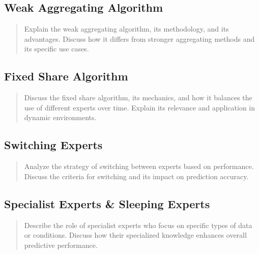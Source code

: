 \documentclass[11pt]{article} %
\theoremstyle{plain}
\theoremstyle{definition}
\begin{document}
\subsection{Weak Aggregating Algorithm}
\begin{quote}
  Explain the weak aggregating algorithm, its methodology, and its advantages. Discuss how it differs from stronger aggregating methods and its specific use cases.
\end{quote}

\subsection{Fixed Share Algorithm}
\begin{quote}
  Discuss the fixed share algorithm, its mechanics, and how it balances the use of different experts over time. Explain its relevance and application in dynamic environments.
\end{quote}

\subsection{Switching Experts}
\begin{quote}
  Analyze the strategy of switching between experts based on performance. Discuss the criteria for switching and its impact on prediction accuracy.
\end{quote}

\subsection{Specialist Experts \& Sleeping Experts}
\begin{quote}
  Describe the role of specialist experts who focus on specific types of data or conditions. Discuss how their specialized knowledge enhances overall predictive performance.
\end{quote}
\end{document}

